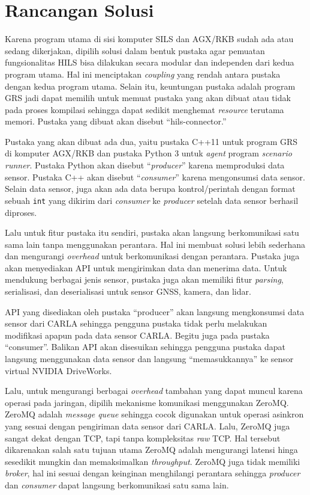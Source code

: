 \section{Rancangan Solusi}

Karena program utama di sisi komputer SILS dan AGX/RKB sudah ada atau sedang
dikerjakan, dipilih solusi dalam bentuk pustaka agar pemuatan fungsionalitas
HILS bisa dilakukan secara modular dan independen dari kedua program utama.
Hal ini menciptakan \textit{coupling} yang rendah antara pustaka dengan kedua
program utama. Selain itu, keuntungan pustaka adalah program GRS jadi dapat
memilih untuk memuat pustaka yang akan dibuat atau tidak pada proses kompilasi
sehingga dapat sedikit menghemat \textit{resource} terutama memori. Pustaka yang
dibuat akan disebut ``hils-connector.''

Pustaka yang akan dibuat ada dua, yaitu pustaka C++11 untuk program GRS di
komputer AGX/RKB dan pustaka Python 3 untuk \textit{agent} program
\textit{scenario runner}. Pustaka Python akan disebut ``\textit{producer}''
karena memproduksi data sensor. Pustaka C++ akan disebut ``\textit{consumer}''
karena mengonsumsi data sensor. Selain data sensor, juga akan ada data berupa
kontrol/perintah dengan format sebuah \texttt{int} yang dikirim dari
\textit{consumer} ke \textit{producer} setelah data sensor berhasil diproses.

Lalu untuk fitur pustaka itu sendiri, pustaka akan langsung berkomunikasi satu
sama lain tanpa menggunakan perantara. Hal ini membuat solusi lebih sederhana
dan mengurangi \textit{overhead} untuk berkomunikasi dengan perantara. Pustaka
juga akan menyediakan API untuk mengirimkan data dan menerima data. Untuk
mendukung berbagai jenis sensor, pustaka juga akan memiliki fitur
\textit{parsing}, serialisasi, dan deserialisasi untuk sensor GNSS, kamera, dan
lidar.

API yang disediakan oleh pustaka ``producer'' akan langsung mengkonsumsi data
sensor dari CARLA sehingga pengguna pustaka tidak perlu melakukan modifikasi
apapun pada data sensor CARLA. Begitu juga pada pustaka ``consumer''. Balikan
API akan disesuikan sehingga pengguna pustaka dapat langsung menggunakan data
sensor dan langsung ``memasukkannya'' ke sensor virtual NVIDIA DriveWorks.

Lalu, untuk mengurangi berbagai \textit{overhead} tambahan yang dapat muncul
karena operasi pada jaringan, dipilih mekanisme komunikasi menggunakan ZeroMQ.
ZeroMQ adalah \textit{message queue} sehingga cocok digunakan untuk operasi
asinkron yang sesuai dengan pengiriman data sensor dari CARLA. Lalu, ZeroMQ juga
sangat dekat dengan TCP, tapi tanpa kompleksitas \textit{raw} TCP. Hal tersebut
dikarenakan salah satu tujuan utama ZeroMQ adalah mengurangi latensi hinga
sesedikit mungkin dan memaksimalkan \textit{throughput}. ZeroMQ juga tidak
memiliki \textit{broker}, hal ini sesuai dengan keinginan menghilangi perantara
sehingga \textit{producer} dan \textit{consumer} dapat langsung berkomunikasi
satu sama lain.

